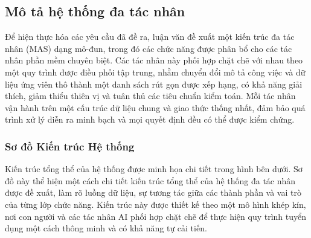 \documentclass{article}
\begin{document}
\subsection{Mô tả hệ thống đa tác nhân}
Để hiện thực hóa các yêu cầu đã đề ra, luận văn đề xuất một kiến trúc đa tác nhân (MAS) dạng mô-đun, trong đó các chức năng được phân bổ cho các tác nhân phần mềm chuyên biệt. Các tác nhân này phối hợp chặt chẽ với nhau theo một quy trình được điều phối tập trung, nhằm chuyển đổi mô tả công việc và dữ liệu ứng viên thô thành một danh sách rút gọn được xếp hạng, có khả năng giải thích, giảm thiểu thiên vị và tuân thủ các tiêu chuẩn kiểm toán. Mỗi tác nhân vận hành trên một cấu trúc dữ liệu chung và giao thức thống nhất, đảm bảo quá trình xử lý diễn ra minh bạch và mọi quyết định đều có thể được kiểm chứng.

\subsubsection{Sơ đồ Kiến trúc Hệ thống}
Kiến trúc tổng thể của hệ thống được minh họa chi tiết trong hình bên dưới. Sơ đồ này thể hiện một cách chi tiết kiến trúc tổng thể của hệ thống đa tác nhân được đề xuất, làm rõ luồng dữ liệu, sự tương tác giữa các thành phần và vai trò của từng lớp chức năng. Kiến trúc này được thiết kế theo một mô hình khép kín, nơi con người và các tác nhân AI phối hợp chặt chẽ để thực hiện quy trình tuyển dụng một cách thông minh và có khả năng tự cải tiến.
\end{document}
